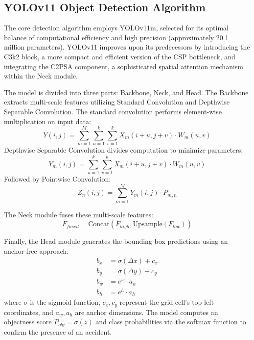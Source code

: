 \documentclass[conference]{IEEEtran}
\begin{document}
\subsection{YOLOv11 Object Detection Algorithm}
The core detection algorithm employs YOLOv11m, selected for its optimal balance of computational efficiency and high precision (approximately 20.1 million parameters). YOLOv11 improves upon its predecessors by introducing the C3k2 block, a more compact and efficient version of the CSP bottleneck, and integrating the C2PSA component, a sophisticated spatial attention mechanism within the Neck module.

The model is divided into three parts: Backbone, Neck, and Head. The Backbone extracts multi-scale features utilizing Standard Convolution and Depthwise Separable Convolution. 
The standard convolution performs element-wise multiplication on input data:
\begin{equation}
Y(i,j)=\sum_{m=1}^{M}\sum_{u=1}^{k}\sum_{v=1}^{k}X_{m}(i+u,j+v)\cdot W_{m}(u,v) \label{eq:stdconv}
\end{equation}
Depthwise Separable Convolution divides computation to minimize parameters:
\begin{equation}
Y_{m}(i,j)=\sum_{u=1}^{k}\sum_{v=1}^{k}X_{m}(i+u,j+v)\cdot W_{m}(u,v) \label{eq:depthconv}
\end{equation}
Followed by Pointwise Convolution:
\begin{equation}
Z_{n}(i,j)=\sum_{m=1}^{M}Y_{m}(i,j)\cdot P_{m,n} \label{eq:pointconv}
\end{equation}

The Neck module fuses these multi-scale features:
\begin{equation}
F_{fused} = \text{Concat}(F_{high}, \text{Upsample}(F_{low})) \label{eq:fusion}
\end{equation}

Finally, the Head module generates the bounding box predictions using an anchor-free approach:
\begin{align}
b_{x} &= \sigma(\Delta x)+c_{x} \nonumber \\
b_{y} &= \sigma(\Delta y)+c_{y} \nonumber \\
b_{w} &= e^{w}\cdot a_{w} \nonumber \\
b_{h} &= e^{h}\cdot a_{h} \label{eq:bbox}
\end{align}
where $\sigma$ is the sigmoid function, $c_x, c_y$ represent the grid cell's top-left coordinates, and $a_w, a_h$ are anchor dimensions. The model computes an objectness score $P_{obj} = \sigma(z)$ and class probabilities via the softmax function to confirm the presence of an accident.
\end{document}
